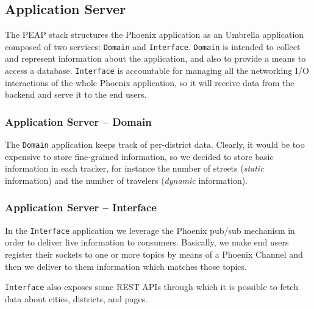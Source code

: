 \subsection{Application Server}\label{sec:sol-des-as}

The PEAP stack structures the Phoenix application as an Umbrella application
composed of two services: \texttt{Domain} and \texttt{Interface}.
\texttt{Domain} is intended to collect and represent information about the
application, and also to provide a means to access a database.
\texttt{Interface} is accountable for managing all the networking I/O
interactions of the whole Phoenix application, so it will receive data from the
backend and serve it to the end users.

\subsubsection{Application Server -- Domain}

The \texttt{Domain} application keeps track of per-district data.
Clearly, it would be too expensive to store fine-grained information, so we
decided to store basic information in each tracker, for instance the number of
streets (\textit{static} information) and the number of travelers
(\textit{dynamic} information).

\subsubsection{Application Server -- Interface}
In the \texttt{Interface} application we leverage the Phoenix pub/sub
mechanism in order to deliver live information to consumers.
Basically, we make end users register their sockets to one or more topics by
means of a Phoenix Channel and then we deliver to them information which
matches those topics.

\texttt{Interface} also exposes some REST APIs through which it is possible to
fetch data about cities, districts, and pages.
